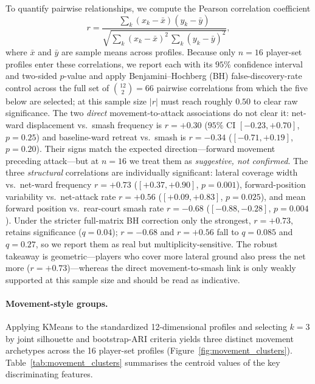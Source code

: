 To quantify pairwise relationships, we compute the Pearson correlation
coefficient
\[
r = \frac{\sum_{k} (x_k - \bar{x})(y_k - \bar{y})}{\sqrt{\sum_k (x_k -
\bar{x})^2\, \sum_k (y_k - \bar{y})^2}},
\]
where $\bar{x}$ and $\bar{y}$ are sample means across profiles. Because only
$n=16$ player-set profiles enter these correlations, we report each with its
$95\%$ confidence interval and two-sided $p$-value and apply Benjamini--Hochberg
(BH) false-discovery-rate control across the full set of $\binom{12}{2}=66$
pairwise correlations from which the five below are selected; at this sample size
$|r|$ must reach roughly $0.50$ to clear raw significance. The two \emph{direct}
movement-to-attack associations do not clear it: net-ward displacement vs.\ smash
frequency is $r=+0.30$ ($95\%$ CI $[-0.23,+0.70]$, $p=0.25$) and baseline-ward
retreat vs.\ smash is $r=-0.34$ ($[-0.71,+0.19]$, $p=0.20$). Their signs match
the expected direction---forward movement preceding attack---but at $n=16$ we
treat them as \emph{suggestive, not confirmed}. The three \emph{structural}
correlations are individually significant: lateral coverage width vs.\ net-ward
frequency $r=+0.73$ ($[+0.37,+0.90]$, $p=0.001$), forward-position variability
vs.\ net-attack rate $r=+0.56$ ($[+0.09,+0.83]$, $p=0.025$), and mean forward
position vs.\ rear-court smash rate $r=-0.68$ ($[-0.88,-0.28]$, $p=0.004$). Under
the stricter full-matrix BH correction only the strongest, $r=+0.73$, retains
significance ($q=0.04$); $r=-0.68$ and $r=+0.56$ fall to $q=0.085$ and $q=0.27$,
so we report them as real but multiplicity-sensitive. The robust takeaway is
geometric---players who cover more lateral ground also press the net more
($r=+0.73$)---whereas the direct movement-to-smash link is only weakly supported
at this sample size and should be read as indicative.

\paragraph{Movement-style groups.}
Applying KMeans to the standardized 12-dimensional profiles and selecting
$k=3$ by joint silhouette and bootstrap-ARI criteria yields three distinct
movement archetypes across the 16 player-set profiles (Figure~\ref{fig:movement_clusters}).
Table~\ref{tab:movement_clusters} summarises the centroid values of the key
discriminating features.

